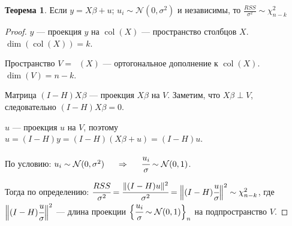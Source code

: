 \documentclass[12pt]{article} %
\theoremstyle{definition} %
\DeclareMathOperator{\col}{col}
\DeclareMathOperator{\colp}{col^{\perp}}
\def \hy{\hat{y}}
\def \hu{\hat{u}}
\def \cN{\mathcal{N}}
\begin{document}
\smallskip
\newtheorem*{theo_n}{Теорема}
\begin{theo_n}
    Если $y=X\beta+u$; $u_i \sim \cN(0, \sigma^2)$ и независимы, то $\frac{RSS}{\sigma^2} \sim \chi_{n-k}^2$
\end{theo_n}

\begin{proof} \hspace{1cm} \par
    \smallskip
    $\hy$ — проекция $y$ на $\col(X)$ — пространство столбцов $X$. $\dim(\col(X)) = k$. \par
    Пространство $V = \colp(X)$ — ортогональное дополнение к $\col(X)$. $\dim(V) = n - k$. \par
    Матрица $(I-H)X\beta$ — проекция $X\beta$ на $V$. Заметим, что $X\beta \perp V$, следовательно $(I-H)X\beta = 0$. \par
    $\hu$ — проекция $u$ на $V$, поэтому $\hu = (I-H)y = (I-H)(X\beta + u) = (I-H)u$. \par
    По условию: $u_i \sim \cN(0, \sigma^2) \hspace{0.5cm} \Rightarrow \hspace{0.5cm} \cfrac{u_i}{\sigma} \sim \cN(0, 1)$. \par
    \smallskip
    Тогда по определению: $\cfrac{RSS}{\sigma^2} = \cfrac{\lVert (I-H)u \rVert^2}{\sigma^2} = \Big\lVert (I-H)\cfrac{u}{\sigma} \Big\rVert^2 \sim \chi_{n-k}^2$, где $\Big\lVert (I-H)\cfrac{u}{\sigma} \Big\rVert^2$ — длина проекции $\Big\{ \cfrac{u_i}{\sigma} \sim \cN(0,1)\Big\}_n$ на подпространство $V$.
\end{proof}
\end{document}
